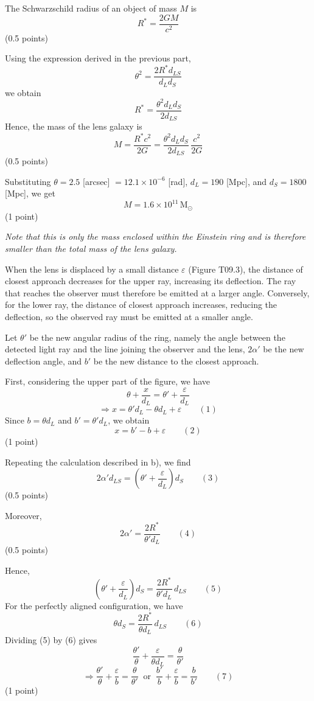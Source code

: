 \begin{description}
  The Schwarzschild radius of an object of mass $M$ is
  \[ R^* = \frac{2GM}{c^2} \]
  \hfill(0.5 points)

  Using the expression derived in the previous part,
  \[ \theta^2 = \frac{2R^* d_{LS}}{d_L d_S} \]
  we obtain
  \[ R^* = \frac{\theta^2 d_L d_S}{2 d_{LS}} \]
  Hence, the mass of the lens galaxy is
  \[ M = \frac{R^* c^2}{2G} = \frac{\theta^2 d_L d_S}{2 d_{LS}}\,\frac{c^2}{2G} \]
  \hfill(0.5 points)

  Substituting $\theta = 2.5$ [arcsec] $= 12.1 \times 10^{-6}$ [rad],
  $d_L = 190$ [Mpc], and $d_S = 1800$ [Mpc], we get
  \[ M = 1.6 \times 10^{11}\,\mathrm{M}_\odot \]
  \hfill(1 point)

  \textit{Note that this is only the mass enclosed within the Einstein ring
  and is therefore smaller than the total mass of the lens galaxy.}

\item[(d)] When the lens is displaced by a small distance $\varepsilon$
  (Figure T09.3), the distance of closest approach decreases for the upper
  ray, increasing its deflection. The ray that reaches the observer must
  therefore be emitted at a larger angle. Conversely, for the lower ray, the
  distance of closest approach increases, reducing the deflection, so the
  observed ray must be emitted at a smaller angle.

  Let $\theta'$ be the new angular radius of the ring, namely the angle
  between the detected light ray and the line joining the observer and the
  lens, $2\alpha'$ be the new deflection angle, and $b'$ be the new distance
  to the closest approach.

  First, considering the upper part of the figure, we have
  \[ \theta + \frac{x}{d_L} = \theta' + \frac{\varepsilon}{d_L} \]
  \[ \Rightarrow x = \theta' d_L - \theta d_L + \varepsilon \qquad (1) \]
  Since $b = \theta d_L$ and $b' = \theta' d_L$, we obtain
  \[ x = b' - b + \varepsilon \qquad (2) \]
  \hfill(1 point)

  Repeating the calculation described in b), we find
  \[ 2\alpha' d_{LS} = \left(\theta' + \frac{\varepsilon}{d_L}\right) d_S
     \qquad (3) \]
  \hfill(0.5 points)

  Moreover,
  \[ 2\alpha' = \frac{2R^*}{\theta' d_L} \qquad (4) \]
  \hfill(0.5 points)

  Hence,
  \[ \left(\theta' + \frac{\varepsilon}{d_L}\right) d_S
     = \frac{2R^*}{\theta' d_L}\, d_{LS} \qquad (5) \]
  For the perfectly aligned configuration, we have
  \[ \theta d_S = \frac{2R^*}{\theta d_L}\, d_{LS} \qquad (6) \]
  Dividing (5) by (6) gives
  \[ \frac{\theta'}{\theta} + \frac{\varepsilon}{\theta d_L}
     = \frac{\theta}{\theta'} \]
  \[ \Rightarrow \frac{\theta'}{\theta} + \frac{\varepsilon}{b}
     = \frac{\theta}{\theta'}
     \ \text{ or }\
     \frac{b'}{b} + \frac{\varepsilon}{b} = \frac{b}{b'} \qquad (7) \]
  \hfill(1 point)


\end{description}
